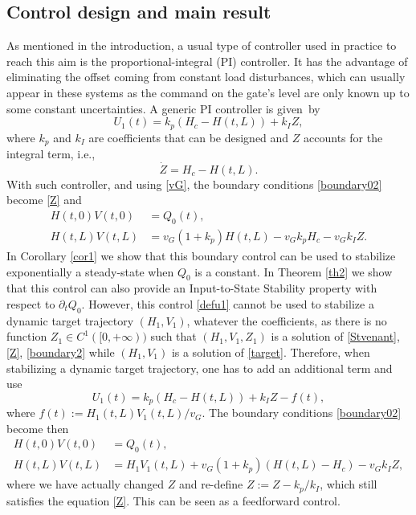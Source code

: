\documentclass[11pt]{article}
\newcommand{\ie}{i.e.,\xspace}
\numberwithin{equation}{section}
\theoremstyle{definition}
\begin{document}
\subsection{Control design and main result}
As mentioned in the introduction, a usual type of controller used in practice to reach this aim is the proportional-integral (PI) controller.
It has the advantage of eliminating the offset coming from constant load disturbances, which can usually appear in these systems
as the command on the gate's level are only known up to some constant uncertainties.
A generic PI controller is given~by
\begin{equation}
U_{1}(t)=k_{p}(H_{c}-H(t,L))+k_{I}Z,
\label{defu1}
\end{equation}
where $k_{p}$ and $k_{I}$ are coefficients that can be designed and $Z$ accounts for the integral term, \ie
\begin{equation}
\dot Z=H_{c}-H(t,L).
\label{Z}
\end{equation}
With such controller, and using \eqref{vG}, the boundary conditions \eqref{boundary02} become {\eqref{Z} and}
\begin{equation}
\label{boundary2}
\begin{split}
H(t,0)V(t,0)&=Q_{0}(t),\\
H(t,L)V(t,L)&=v_{G}(1+k_{p})H(t,L)-v_{G}k_{p}H_{c}-v_{G}k_{I}Z.
\end{split}
\end{equation}
In Corollary \ref{cor1} we show that this boundary control can be used to stabilize {exponentially} a steady-state when $Q_{0}$ is a constant.
In Theorem \ref{th2} we show that this control can also provide an Input-to-State Stability property with respect to $\partial_{t}Q_{0}$.
However, this control \eqref{defu1} cannot be used to stabilize {a} dynamic target trajectory $(H_{1},V_{1})$, {whatever the coefficients,} as there is no function $Z_{1}\in C^{1}([0,+\infty))$ such that $(H_{1},V_{1},Z_{1})$
is a solution of \eqref{Stvenant}, \eqref{Z}, \eqref{boundary2} while $(H_{1},V_{1})$ is a solution of \eqref{target}. Therefore, when stabilizing a dynamic target trajectory, one has to add an additional term and use
\begin{equation}
U_{1}(t)=k_{p}(H_{c}-H(t,L))+k_{I}Z-f(t),
\label{defu12}
\end{equation}
where $f(t):=H_{1}(t,L)V_{1}(t,L)/v_{G}$. The boundary conditions \eqref{boundary02} become then
\begin{equation}
\begin{split}
H(t,0)V(t,0)&=Q_{0}(t),\\
H(t,L)V(t,L)&=H_{1}V_{1}(t,L)+v_{G}(1+k_{p})(H(t,L)-H_{c})-v_{G}k_{I}Z,
\label{boundary1}
\end{split}
\end{equation}
where we have actually changed $Z$ and re-define $Z:=Z-k_{p}/k_{I}$, which still satisfies the equation \eqref{Z}. {This can be seen as a feedforward control.}
\end{document}
